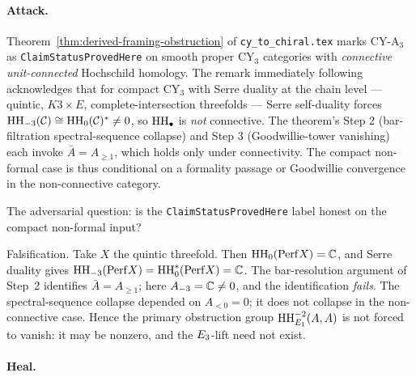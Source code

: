 \paragraph{Attack.} Theorem~\ref{thm:derived-framing-obstruction}
of \texttt{cy\_to\_chiral.tex} marks CY-A$_3$ as
\texttt{ClaimStatusProvedHere} on smooth proper CY$_3$ categories
with \emph{connective unit-connected} Hochschild homology. The
remark immediately following acknowledges that for compact CY$_3$
with Serre duality at the chain level --- quintic, $K3 \times E$,
complete-intersection threefolds --- Serre self-duality forces
$\mathrm{HH}_{-3}(\mathcal{C}) \cong \mathrm{HH}_0(\mathcal{C})^* \neq 0$, so $\mathrm{HH}_\bullet$ is
\emph{not} connective. The theorem's Step 2 (bar-filtration
spectral-sequence collapse) and Step 3 (Goodwillie-tower
vanishing) each invoke $\bar{A} = A_{\geq 1}$, which holds only
under connectivity. The compact non-formal case is thus
conditional on a formality passage or Goodwillie convergence in
the non-connective category.

The adversarial question: is the
\texttt{ClaimStatusProvedHere} label honest on the compact
non-formal input?

Falsification. Take $X$ the quintic threefold. Then $\mathrm{HH}_0(\mathrm{Perf} X)
= \mathbb{C}$, and Serre duality gives $\mathrm{HH}_{-3}(\mathrm{Perf} X) = \mathrm{HH}_0^*(\mathrm{Perf} X) =
\mathbb{C}$. The bar-resolution argument of Step~2 identifies
$\bar A = A_{\geq 1}$; here $A_{-3} = \mathbb{C} \neq 0$, and the
identification \emph{fails}. The spectral-sequence collapse
depended on $A_{<0} = 0$; it does not collapse in the non-connective
case. Hence the primary obstruction group
$\mathrm{HH}^{-2}_{E_1}(A, A)$ is not forced to vanish: it may be
nonzero, and the $E_3$-lift need not exist.

\paragraph{Heal.}


